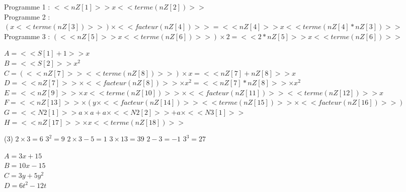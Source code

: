 \renewcommand{\headrulewidth}{1pt}

\renewcommand{\footrulewidth}{1pt}
\fancyfoot[C]{} 
\fancyfoot[L]{}



\setcounter{exo}{0}
\vfill
\begin{correction}
\begin{multicols}{2}
%
%

\exo{}

Programme 1 : $<<nZ[1]>> x <<terme(nZ[2])>>$\\
Programme 2 : $(x <<terme(nZ[3])>>)\times <<facteur(nZ[4])>>= <<nZ[4]>>  x  << terme( nZ[4] * nZ[3] ) >> $\\
Programme 3 : $( <<nZ[5]>> x <<terme(nZ[6])>> )\times 2= <<2* nZ[5]>> x <<terme(nZ[6])>>$

\exo{}


\begin{multicols}{2}
$A=<<S[1]+1>> x$\\
$B=<<S[2]>>x^2$\\
$C=(<<nZ[7]>> <<terme(nZ[8])>>)\times x = <<nZ[7] + nZ[8]>>  x$\\
$D=<<nZ[7]>> \times <<facteur(nZ[8])>>\times x^2 = <<nZ[7] * nZ[8]>>\times x^2$\\
$E=<<nZ[9]>> \times x <<terme(nZ[10])>>\times <<facteur(nZ[11])>> <<terme(nZ[12])>> x$\\
$F=<<nZ[13]>> \times (y\times <<facteur(nZ[14])>> <<terme(nZ[15])>> \times <<facteur(nZ[16])>>)$\\
$G=<<N2[1]>> a\times  a+a\times <<N2[2]>>+a\times <<N3[1]>>$\\
$H= <<nZ[17]>>\times x <<terme(nZ[18])>>$
\end{multicols}



\exo{}


\begin{tasks}[counter-format = {tsk[1].},label-format={\bfseries}](3)
	\task $2\times3=6$ 
	\task $3^2=9$
	\task $2\times3-5=1$
	\task $3\times13=39$
	\task $2-3=-1$
	\task $3^3=27$
\end{tasks}

\exo{}


\begin{multicols}{2}
$A=3x+15$\\
$B=10x-15$\\
$C=3y+5y^2$\\
$D=6t^2-12t$
\end{multicols}

\end{multicols}

	


	
\end{correction}

